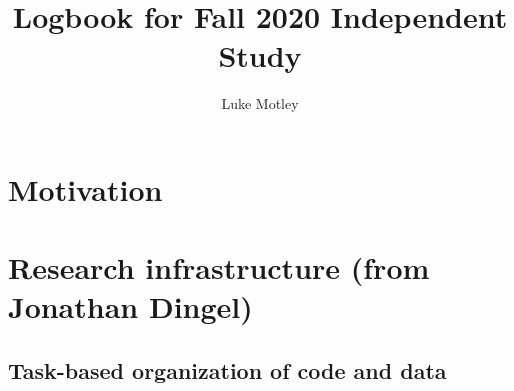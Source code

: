 \documentclass{report}
\title{Logbook for Fall 2020 Independent Study}
\author{
Luke Motley
}
\date{}
\numberwithin{equation}{section}
\numberwithin{figure}{section}
\numberwithin{table}{section}
\begin{document}
\maketitle

\renewcommand{\thechapter}{\Alph{chapter}}
\setcounter{tocdepth}{2}
\tableofcontents
\etocsettocstyle{}{} %

\chapter{Motivation}

%
%
%
%
%
%



\chapter{Research infrastructure (from Jonathan Dingel)}


\section{Task-based organization of code and data} 
\end{document}
